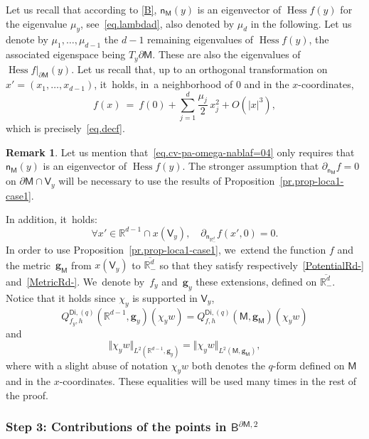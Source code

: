 \documentclass[JEP,XML,SOM,Unicode,NoEqCountersInSection,NoFloatCountersInSection,published]{cedram}
\newcommand{\mbf}[1]{\mathbf{#1}}
\let\pa\partial
\DeclareMathOperator{\hess}{Hess}\let\Hess\hess
\theoremstyle{plain}
\theoremstyle{definition}
\newtheorem{remark}[proposition]{Remark}
\begin{document}
Let us recall that according to \ref{B}, $\mathsf n_{\mathsf M}(y)$ is an eigenvector of $\Hess f(y)$ for the eigenvalue $\mu_y$, see~\eqref{eq.lambdad}, also denoted by $\mu_{d}$ in the following.
Let us denote by $\mu_1,\dots,\mu_{d-1}$ the $d-1$ remaining eigenvalues of
$\Hess f(y)$, the associated eigenspace being $T_y\partial \mathsf M$.
These are also the eigenvalues of $\hess f|_{\partial \mathsf M}(y)$.
Let us recall that, up to an orthogonal transformation on
$x'=(x_{1},\dots,x_{d-1})$, it~holds, in~a neighborhood of $0$ and in the $x$-coordinates,
\begin{equation}\label{eq.cv-pa-omega-nablaf=04}
f(x)\ =\ f(0)+ \sum_{j=1}^d \frac{\mu_j}{2} \, x_j^2+ O(\vert x\vert^3),
\end{equation}
which is precisely~\eqref{eq.decf}.
\begin{remark}
Let us mention that~\eqref{eq.cv-pa-omega-nablaf=04} only requires that $\mathsf n_{\mathsf M}(y)$ is an eigenvector of $\Hess f(y)$. The stronger assumption that $\partial_{\mathsf n_{\mathsf M}}f=0$ on $\pa \mathsf M\cap \mathsf V_y$ will be necessary to use the results of Proposition~\ref{pr.prop-loca1-case1}.
\end{remark}

In addition, it~holds:
\begin{equation}\label{eq.stable2}
\forall x'\in \mathbb R^{d-1} \cap x(\mathsf V_y), \quad \partial_{\mathsf n_{\mathbb R^d_-}}f(x',0)=0.
\end{equation}
In order to use Proposition~\ref{pr.prop-loca1-case1}, we~extend the function $f$ and the metric~$\mbf g_{\mathsf M}$ from $x(\mathsf V_y)$ to $\overline{\mathbb R^{d}_-}$ so that they satisfy respectively~\ref{PotentialRd-} and~\ref{MetricRd-}. We~denote by~$f_y$ and~$\mbf g_y$ these extensions, defined on $\overline{\mathbb R^d_-}$.
Notice that it holds since $\chi_y$ is supported in $\mathsf V_y$,
\[
Q_{f_y,h}^{\mathsf{Di},(q)}(\mathbb R^{d-1},\mbf g_y)(\chi_y
w)=Q_{f,h}^{\mathsf{Di},(q)}(\mathsf M,\mbf g_{\mathsf M})(\chi_y
w)
\]
and
\[
\Vert \chi_y w \Vert_{L^2(\mathbb R^{d-1},\mbf
g_y)}= \Vert \chi_y w \Vert_{L^2(\mathsf M,\mbf g_{\mathsf M})},
\]
where with a slight abuse of notation $\chi_y w$ both denotes the $q$-form defined on $\mathsf M$ and in the $x$-coordinates. These equalities will be used many times in the rest of the proof.

\subsubsection*{Step 3: Contributions of the points in $ \mathsf B^{\pa \mathsf M,2}$}
\end{document}
